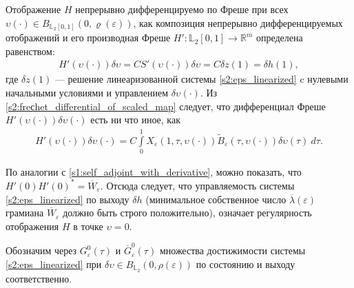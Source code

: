 \documentclass[../main.tex]{subfiles}
\begin{document}
Отображение $ H $ непрерывно дифференцируемо по Фреше при всех $ \upsilon(\cdot) \in  B_{\mathbb{L}_2[0,1]}(0,\varrho(\varepsilon)) $, как композиция непрерывно дифференцируемых отображений и его производная Фреше $ H': \mathbb{L}_2[0,1]  \rightarrow  \mathbb{R}^m $ определена равенством:
\begin{gather*}
	H'( \upsilon(\cdot))\delta \upsilon =  C S'(\upsilon(\cdot))\delta  \upsilon = C \delta z(1) = \delta h(1),
\end{gather*}
где $ \delta z(1) $ --- решение линеаризованной системы \eqref{s2:eps_linearized} c нулевыми начальными условиями и управлением $  \delta  \upsilon(\cdot) $. 
 Из \eqref{s2:freсhet_differential_of_scaled_map} следует, что дифференциал Фреше $ H'(\upsilon(\cdot)) \delta \upsilon(\cdot) $ есть ни что иное, как
\begin{gather*}
	H'(\upsilon(\cdot)) \delta \upsilon(\cdot) = C \int\limits_0^1 X_{\varepsilon}(1,\tau, \upsilon(\cdot)) \widetilde{B}_{\varepsilon} (\tau, \upsilon(\cdot)) \delta \upsilon(\tau) \ d \tau.
\end{gather*}

По аналогии с \eqref{s1:self_adjoint_with_derivative}, можно показать, что $ H'(0) H'(0)^* = \overline{W}_{\varepsilon}$. 
Отсюда следует, что управляемость системы \eqref{s2:eps_linearized} по выходу $\delta h$ (минимальное собственное число $\overline{\lambda}(\varepsilon)$ грамиана $ \overline{W}_{\varepsilon}$ должно быть строго положительно), означает регулярность отображения $H$ в точке $\upsilon = 0$.

Обозначим через $G^0_{\varepsilon}(\tau)$ и $\overline{G}^0_{\varepsilon}(\tau)$ множества достижимости системы \eqref{s2:eps_linearized} при $\delta \upsilon \in B_{\mathbb{L}_2}(0, \rho(\varepsilon))$ по состоянию и выходу соответственно.
\end{document}
